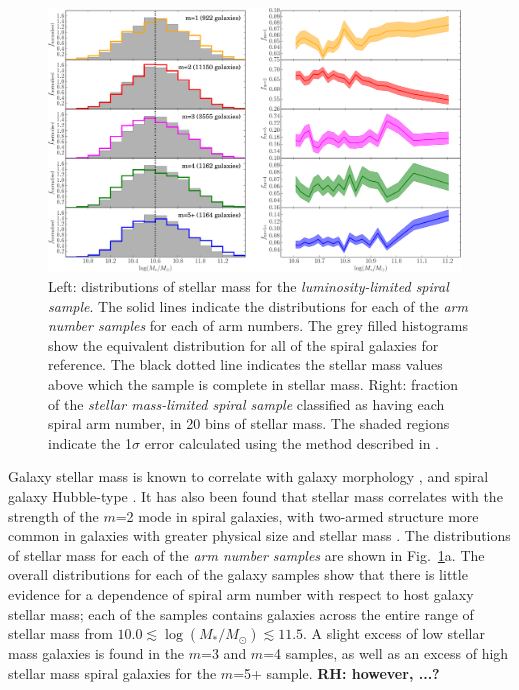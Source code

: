 \documentclass[useAMS,usenatbib]{mn2e}
\newcommand{\rh}[1]{{\bf \textcolor{RoyalPurple}{RH: #1}}}
\begin{document}
\begin{figure}
		\centering

        \includegraphics[width=0.975\textwidth]{Images/Results/mass_plots.pdf}

        \caption{Left: distributions of stellar mass for the \textit{luminosity-limited spiral sample}. The solid lines indicate the distributions for each of the \textit{arm number samples} for each of arm numbers. The grey filled histograms show the equivalent distribution for all of the spiral galaxies for reference. The black dotted line indicates the stellar mass values above which the sample is complete in stellar mass. Right: fraction of the \textit{stellar mass-limited spiral sample} classified as having each spiral arm number, in 20 bins of stellar mass. The shaded regions indicate the 1$\sigma$ error calculated using the method described in \citet{Cameron_11}.}

        \label{fig:mass_plots}

\end{figure}

Galaxy stellar mass is known to correlate with galaxy morphology \citep{Bamford_09,Kelvin_14}, and spiral galaxy Hubble-type \citep{Munoz-Mateos_15}. It has also been found that stellar mass correlates with the strength of the $m$=2 mode in spiral galaxies, with two-armed structure more common in galaxies with greater physical size \citep{EE_87} and stellar mass \citep{Kendall_15}. The distributions of stellar mass for each of the \textit{arm number samples} are shown in Fig.~\ref{fig:mass_plots}a. The overall distributions for each of the galaxy samples show that there is little evidence for a dependence of spiral arm number with respect to host galaxy stellar mass; each of the samples contains galaxies across the entire range of stellar mass from $10.0 \lesssim \log(M_*/M_{\odot}) \lesssim 11.5$. A slight excess of low stellar mass galaxies is found in the $m$=3 and $m$=4 samples, as well as an excess of high stellar mass spiral galaxies for the $m$=5+ sample. \rh{however, ...?}
\end{document}
